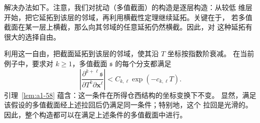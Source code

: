 解决办法如下。注意，我们对扰动（多值截面）的构造是逐层构造：从较低
维层开始，把它延拓到该层的邻域，再利用横截性定理继续延拓。关键在于，
若多值截面在某一层上横截，那么向其邻域的任意延拓仍然横截。因此，对
这种延拓有很大的选择自由。

利用这一自由，把截面延拓到该层的邻域，使其沿 $T$ 坐标按指数阶衰减。
在当前例子中，要求对 $k\geq1$，多值截面 $\mathfrak s$ 的每个分支都满足
\[
 \left\lvert
 \frac{\partial^{k+\ell}\mathfrak s}
      {\partial T^k\partial\mathbf x^\ell}
 \right\rvert
 <C_{k,\ell}\exp(-c_{k,\ell}T).
\]
引理~\ref{lem:a1-58} 蕴含：这一条件在所得仓西结构的坐标变换下不变。
显然，满足该假设的多值截面经上述拉回后仍满足同一条件；特别地，这个
拉回是光滑的。因此，整个构造都可以在满足上述条件的多值截面中进行。
